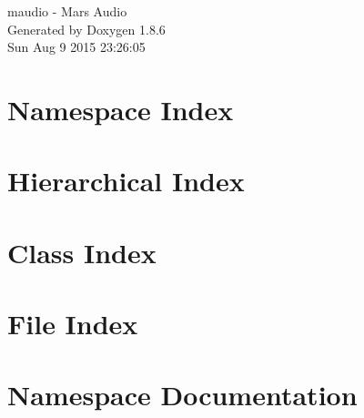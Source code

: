 \documentclass[twoside]{book}
\newcommand{\clearemptydoublepage}{%
  \newpage{\pagestyle{empty}\cleardoublepage}%
}
\begin{document}
\hypersetup{pageanchor=false}
\begin{titlepage}
\vspace*{7cm}
\begin{center}%
{\Large maudio -\/ Mars Audio }\\
\vspace*{1cm}
{\large Generated by Doxygen 1.8.6}\\
\vspace*{0.5cm}
{\small Sun Aug 9 2015 23:26:05}\\
\end{center}
\end{titlepage}
\clearemptydoublepage
\tableofcontents
\clearemptydoublepage
{}
\hypersetup{pageanchor=true}

\chapter{Namespace Index}

\chapter{Hierarchical Index}

\chapter{Class Index}

\chapter{File Index}

\chapter{Namespace Documentation}

\end{document}
